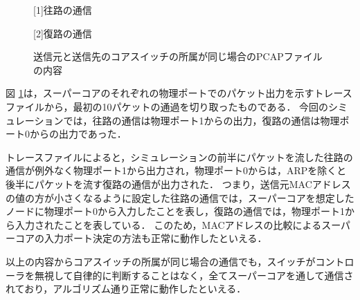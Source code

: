 \begin{figure}[tb]
	\begin{center}
		
		\begin{center}
			\hspace{1.6cm} [1]往路の通信
		\end{center}
		
		\begin{center}
			\hspace{1.6cm} [2]復路の通信
		\end{center}
		\caption{送信元と送信先のコアスイッチの所属が同じ場合のPCAPファイルの内容}
		\label{fig:4-6}
	\end{center}
\end{figure}

図 \ref{fig:4-6}は，スーパーコアのそれぞれの物理ポートでのパケット出力を示すトレースファイルから，最初の10パケットの通過を切り取ったものである．
今回のシミュレーションでは，往路の通信は物理ポート1からの出力，復路の通信は物理ポート0からの出力であった．

トレースファイルによると，シミュレーションの前半にパケットを流した往路の通信が例外なく物理ポート1から出力され，物理ポート0からは，ARPを除くと後半にパケットを流す復路の通信が出力された．
つまり，送信元MACアドレスの値の方が小さくなるように設定した往路の通信では，スーパーコアを想定したノードに物理ポート0から入力したことを表し，復路の通信では，物理ポート1から入力されたことを表している．
このため，MACアドレスの比較によるスーパーコアの入力ポート決定の方法も正常に動作したといえる．

以上の内容からコアスイッチの所属が同じ場合の通信でも，スイッチがコントローラを無視して自律的に判断することはなく，全てスーパーコアを通して通信されており，アルゴリズム通り正常に動作したといえる．

